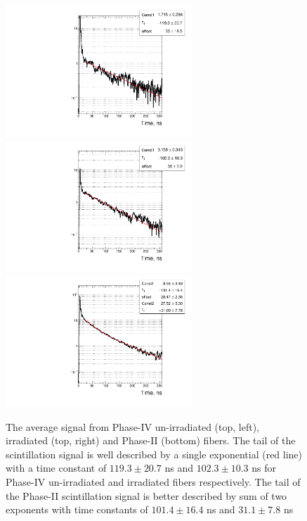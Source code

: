 \documentclass[a4paper,11pt]{article}
\begin{document}
\begin{figure}[ht]
\begin{center}
      \includegraphics[width=7cm]{Figures/B5_R11864_fit_zoom_singleLog.pdf}
      \includegraphics[width=7cm]{Figures/B4_R11863_fit_zoom_singleLog.pdf}
      \includegraphics[width=7cm]{Figures/B1_R11862_fit_zoom_singleLog.pdf}
\caption{\small The average signal from Phase-IV un-irradiated (top, left), irradiated (top, right) and Phase-II (bottom) fibers. The tail of the scintillation signal is well described by a single exponential (red line) with a time constant of $119.3 \pm 20.7$ ns and $102.3 \pm 10.3$ ns for Phase-IV un-irradiated and irradiated fibers respectively. The tail of the Phase-II scintillation signal is better described by sum of two exponents with time constants of $101.4 \pm 16.4$ ns and $31.1  \pm 7.8$ ns }
    \label{fig:phase4scintTime}
\end{center}
\end{figure}

\end{document}
